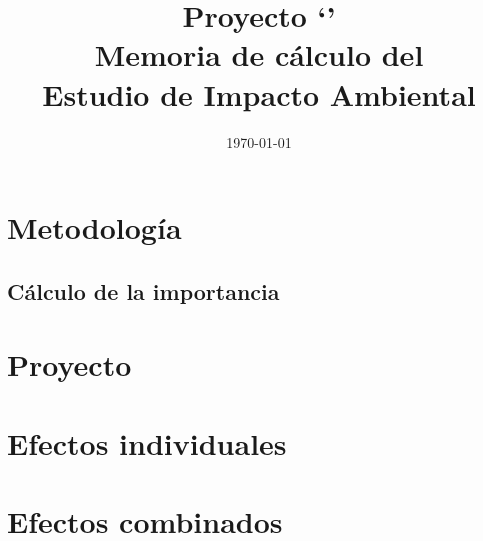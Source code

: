 \documentclass[A4,10pt,twosides]{book}
\begin{document}
\frontmatter

\title{Proyecto `\projectTitle{}'\\Memoria de cálculo del\\Estudio de Impacto Ambiental}
\author{\projectAuthor{}}
\date{\today}

\maketitle

\tableofcontents
\listoftables
\listoffigures

\mainmatter

\chapter[Metodolog\'ia]{Metodología}

\section{Cálculo de la importancia}

\tdeiaMethodologyImportance{}

\tdeiaMethodologyAggregators{}

\tdeiaMethodologyEffectPropierties{}


\chapter{Proyecto}

\tdeiaDescriptionThisProject{}

\tdeiaProjectFactors{}

\tdeiaProjectActions{}

\chapter{Efectos individuales}

\tdeiaIndividualEffects{}

\chapter{Efectos combinados}

\tdeiaAggregations{}

\appendix


 
\end{document}
